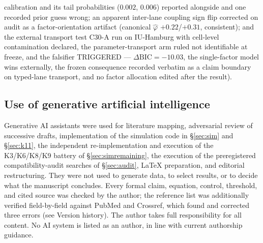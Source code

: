 \documentclass[9pt,twocolumn]{article}
\begin{document}
calibration and its tail probabilities ($0.002$, $0.006$) reported alongside and one recorded prior guess wrong; an apparent inter-lane coupling sign flip corrected on audit as a factor-orientation artifact (canonical $\hat\varphi$ $+0.22$/$+0.31$, consistent); and the external transport test C30-A run on IU-Hamburg with cell-level contamination declared, the parameter-transport arm ruled not identifiable at freeze, and the falsifier TRIGGERED --- $\Delta\mathrm{BIC}=-10.03$, the single-factor model wins externally, the frozen consequence recorded verbatim as a claim boundary on typed-lane transport, and no factor allocation edited after the result).

\subsection*{Use of generative artificial intelligence}
Generative AI assistants were used for literature mapping, adversarial review of successive drafts, implementation of the simulation code in \S\ref{sec:sim} and \S\ref{sec:k11}, the independent re-implementation and execution of the K3/K6/K8/K9 battery of \S\ref{sec:simremaining}, the execution of the preregistered compatibility-audit searches of \S\ref{sec:audit}, LaTeX preparation, and editorial restructuring. They were not used to generate data, to select results, or to decide what the manuscript concludes. Every formal claim, equation, control, threshold, and cited source was checked by the author; the reference list was additionally verified field-by-field against PubMed and Crossref, which found and corrected three errors (see Version history). The author takes full responsibility for all content. No AI system is listed as an author, in line with current authorship guidance.
\end{document}
